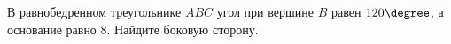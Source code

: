\begin{ex}
	\begin{condition}
		В равнобедренном треугольнике \( ABC  \) угол при вершине \( B  \) равен \( 120\degree \), а основание равно \( 8 \). Найдите боковую сторону.
	\end{condition}
\end{ex}